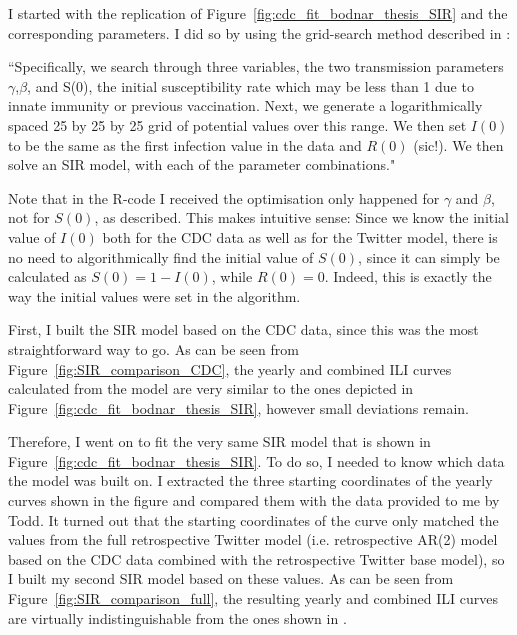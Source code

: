 \documentclass[11pt, a4paper,twoside]{report}\usepackage[]{graphicx}\usepackage[]{color}
\begin{document}
I started with the replication of Figure~\ref{fig:cdc_fit_bodnar_thesis_SIR} and the corresponding parameters. I did so by using the grid-search method described in \cite{bodnar_data_2015}: 

``Specifically, we search through three variables, the two transmission parameters $\gamma$,$\beta$, and S(0), the initial susceptibility rate which may be less than 1 due to innate immunity or previous vaccination. Next, we generate a logarithmically spaced 25 by 25 by 25 grid of potential values over this range. We then set $I(0)$ to be the same as the first infection value in the data and $R(0)$ (sic!). We then solve an SIR model, with each of the parameter combinations." 

Note that in the R-code I received the optimisation only happened for $\gamma$ and $\beta$, not for $S(0)$, as described. This makes intuitive sense: Since we know the initial value of $I(0)$ both for the CDC data as well as for the Twitter model, there is no need to algorithmically find the initial value of $S(0)$, since it can simply be calculated as $S(0)=1-I(0)$, while $R(0)=0$. Indeed, this is exactly the way the initial values were set in the algorithm.

First, I built the SIR model based on the CDC data, since this was the most straightforward way to go. As can be seen from Figure~\ref{fig:SIR_comparison_CDC}, the yearly and combined ILI curves calculated from the model are very similar to the ones depicted in Figure~\ref{fig:cdc_fit_bodnar_thesis_SIR}, however small deviations remain.

Therefore, I went on to fit the very same SIR model that is shown in Figure~\ref{fig:cdc_fit_bodnar_thesis_SIR}. To do so, I needed to know which data the model was built on. I extracted the three starting coordinates of the yearly curves shown in the figure and compared them with the data provided to me by Todd. It turned out that the starting coordinates of the curve only matched the values from the full retrospective Twitter model (i.e. retrospective AR(2) model based on the CDC data combined with the retrospective Twitter base model), so I built my second SIR model based on these values. As can be seen from Figure~\ref{fig:SIR_comparison_full}, the resulting yearly and combined ILI curves are virtually indistinguishable from the ones shown in \cite{bodnar_data_2015}.
\end{document}
